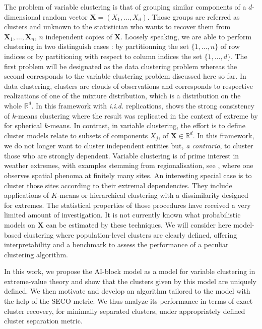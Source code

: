 \documentclass[11pt]{article}
\begin{document}
	The problem of variable clustering is that of grouping similar components of a $d$-dimensional random vector $\textbf{X} = (X_1,\dots,X_d)$. Those groups are referred as clusters and unknown to the statistician who wants to recover them from $\textbf{X}_1, \dots, \textbf{X}_n$, $n$ independent copies of $\textbf{X}$. Loosely speaking, we are able to perform clustering in two distinguish cases : by partitionning the set $\{1,\dots, n\}$ of row indices or by partitioning with respect to column indices the set $\{1,\dots,d\}$. The first problem will be designated as the data clustering problem whereas the second corresponds to the variable clustering problem discussed here so far. In data clustering, clusters are clouds of observations and corresponds to respective realizations of one of the mixture distribution, which is a distribution on the whole $\mathbb{R}^d$. In this framework with \emph{i.i.d.} replications, \cite{pollard1981strong} shows the strong consistency of $k$-means clustering where the result was replicated in the context of extreme by \cite{janssen2020k} for spherical $k$-means. In contrast, in variable clustering, the effort is to define cluster models relate to subsets of components $X_j$, of $\textbf{X} \in \mathbb{R}^d$. In this framework, we do not longer want to cluster independent entities but, \emph{a contrario}, to cluster those who are strongly dependent. Variable clustering is of prime interest in weather extremes, with examples stemming from regionalisation, see \cite{bernard2013clustering,bador2015spatial, saunders2021regionalisation}, where one observes spatial phenoma at finitely many sites. An interesting special case is to cluster those sites according to their extremal dependencies. They include applications of $K$-means or hierarchical clustering with a dissimilarity designed for extremes. The statistical properties of those procedures have received a very limited amount of investigation. It is not currently known what probabilistic models on $\textbf{X}$ can be estimated by these techniques. We will consider here model-based clustering where population-level clusters are clearly defined, offering interpretability and a benchmark to assess the performance of a peculiar clustering algorithm.
	
	In this work, we propose the AI-block model as a model for variable clustering in extreme-value theory and show that the clusters given by this model are uniquely defined. We then motivate and develop an algorithm tailored to the model with the help of the SECO metric. We thus analyze its performance in terms of exact cluster recovery, for minimally separated clusters, under appropriately defined cluster separation metric.
	
\end{document}
